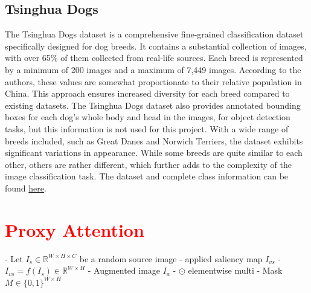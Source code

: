 \subsection{Tsinghua Dogs}
The Tsinghua Dogs dataset \cite{zouNewDatasetDog2020} is a comprehensive fine-grained classification dataset specifically designed for dog breeds. It contains a substantial collection of images, with over 65\% of them collected from real-life sources. Each breed is represented by a minimum of 200 images and a maximum of 7,449 images. According to the authors, these values are somewhat proportionate to their relative population in China. This approach ensures increased diversity for each breed compared to existing datasets. The Tsinghua Dogs dataset also provides annotated bounding boxes for each dog's whole body and head in the images, for object detection tasks, but this information is not used for this project. With a wide range of breeds included, such as Great Danes and Norwich Terriers, the dataset exhibits significant variations in appearance. While some breeds are quite similar to each other, others are rather different, which further adds to the complexity of the image classification task. 
The dataset and complete class information can be found \href{https://cg.cs.tsinghua.edu.cn/ThuDogs/}{here}.


\section{\textcolor{red}{Proxy Attention}}
- Let $I_{s} \in \mathbb{R}^{W \times H \times C}$ be a random source image
- applied saliency map $I_{vs}$ 
	- $I_{vs} = f(I_{s}) \in \mathbb{R}^{W \times H}$
	- Augmented image $I_{a}$
	- $\odot$ elementwise multi 
	- Mask $M \in \{0,1\}^{W \times H}$ 

